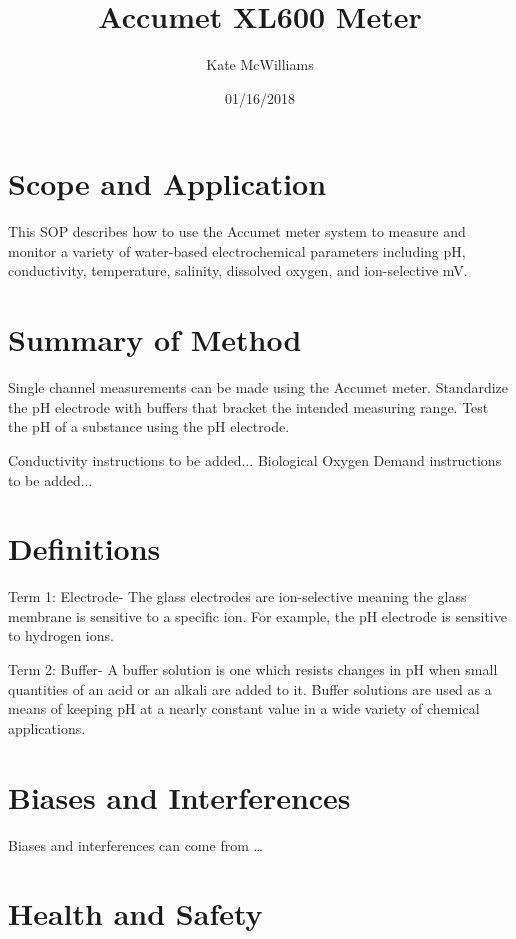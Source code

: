 \documentclass[12pt]{../SOP3}\usepackage[]{graphicx}\usepackage[]{color}
\title{Accumet XL600 Meter}
\date{01/16/2018}
\author{Kate McWilliams}
\begin{document}
\maketitle

\section{Scope and Application}

\NP This SOP describes how to use the Accumet meter system to measure and monitor a variety of water-based electrochemical parameters including pH, conductivity, temperature, salinity, dissolved oxygen, and ion-selective mV.

\section{Summary of Method}

\NP Single channel measurements can be made using the Accumet meter. Standardize the pH electrode with buffers that bracket the intended measuring range. Test the pH of a substance using the pH electrode.

\NP Conductivity instructions to be added...
\NP Biological Oxygen Demand instructions to be added...

\tableofcontents

\newpage

\section{Definitions}

\NP Term 1: Electrode- The glass electrodes are ion-selective meaning the glass membrane is sensitive to a specific ion. For example, the pH electrode is sensitive to hydrogen ions. 

\NP Term 2: Buffer- A buffer solution is one which resists changes in pH when small quantities of an acid or an alkali are added to it. Buffer solutions are used as a means of keeping pH at a nearly constant value in a wide variety of chemical applications. 

\section{Biases and Interferences}

\NP Biases and interferences can come from \dots

\section{Health and Safety}
\end{document}
